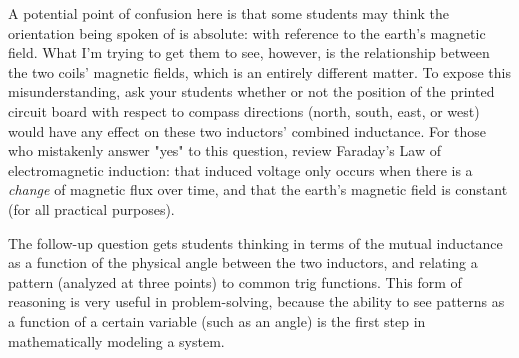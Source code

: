 
A potential point of confusion here is that some students may think the orientation being spoken of is absolute: with reference to the earth's magnetic field.  What I'm trying to get them to see, however, is the relationship between the two coils' magnetic fields, which is an entirely different matter.  To expose this misunderstanding, ask your students whether or not the position of the printed circuit board with respect to compass directions (north, south, east, or west) would have any effect on these two inductors' combined inductance.  For those who mistakenly answer "yes" to this question, review Faraday's Law of electromagnetic induction: that induced voltage only occurs when there is a {\it change} of magnetic flux over time, and that the earth's magnetic field is constant (for all practical purposes).

The follow-up question gets students thinking in terms of the mutual inductance as a function of the physical angle between the two inductors, and relating a pattern (analyzed at three points) to common trig functions.  This form of reasoning is very useful in problem-solving, because the ability to see patterns as a function of a certain variable (such as an angle) is the first step in mathematically modeling a system.




